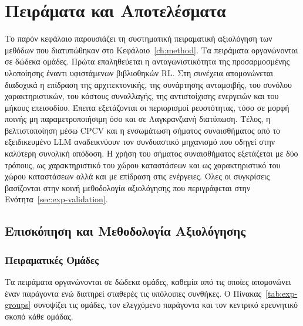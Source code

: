 
\chapter{Πειράματα και Αποτελέσματα}
\label{ch:experiments}

Το παρόν κεφάλαιο παρουσιάζει τη συστηματική πειραματική αξιολόγηση των μεθόδων που 
διατυπώθηκαν στο Κεφάλαιο~\ref{ch:method}. Τα πειράματα οργανώνονται σε δώδεκα ομάδες. 
Πρώτα επαληθεύεται η ανταγωνιστικότητα της προσαρμοσμένης 
υλοποίησης έναντι υφιστάμενων βιβλιοθηκών RL. Στη συνέχεια απομονώνεται διαδοχικά η 
επίδραση της αρχιτεκτονικής, της συνάρτησης ανταμοιβής, του συνόλου χαρακτηριστικών, 
του κόστους συναλλαγής, της αντιστοίχισης ενεργειών και του μήκους επεισοδίου. 
Έπειτα εξετάζονται οι περιορισμοί ρευστότητας, τόσο σε μορφή ποινής μη παραμετροποιήσιμη όσο και σε 
Λαγκρανζιανή διατύπωση. Τέλος, η βελτιστοποίηση μέσω CPCV και η ενσωμάτωση σήματος 
συναισθήματος από το εξειδικευμένο LLM αναδεικνύουν τον συνδυαστικό μηχανισμό που οδηγεί στην καλύτερη 
συνολική απόδοση. Η χρήση του σήματος συναισθήματος εξετάζεται με δύο τρόπους, ως χαρακτηριστικό του χώρου καταστάσεων 
και ως χαρακτηριστικό του χώρου καταστάσεων αλλά και με επίδραση στις ενέργειες. 
Όλες οι συγκρίσεις βασίζονται στην κοινή μεθοδολογία αξιολόγησης που 
περιγράφεται στην Ενότητα~\ref{sec:exp-validation}.

\section{Επισκόπηση και Μεθοδολογία Αξιολόγησης}
\label{sec:exp-overview}

\subsection{Πειραματικές Ομάδες}
\label{subsec:exp-groups}

Τα πειράματα οργανώνονται σε δώδεκα ομάδες, καθεμία από τις οποίες απομονώνει έναν 
παράγοντα ενώ διατηρεί σταθερές τις υπόλοιπες συνθήκες. Ο Πίνακας~\ref{tab:exp-groups} 
συνοψίζει τις ομάδες, τον ελεγχόμενο παράγοντα και τον κεντρικό ερευνητικό σκοπό κάθε ομάδας.

